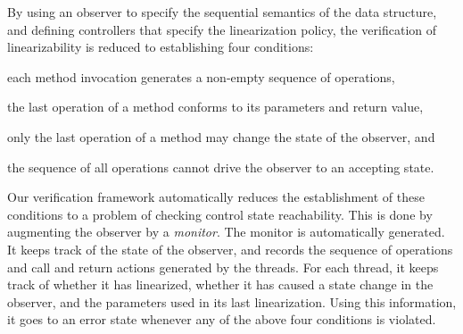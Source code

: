  By using an observer to specify the sequential semantics of the
data structure, and defining controllers that specify the linearization policy,
the verification of linearizability is reduced to establishing four conditions:
\begin{inparaenum}[(i)]
\item
  each method invocation generates a non-empty sequence of operations,
\item
  the last operation of a method conforms to its parameters and return value,
\item
  only the last operation of a method may
  change the state of the observer,
  and
\item
  the sequence of all operations
  cannot drive the observer to an accepting state.
\end{inparaenum}
Our verification framework automatically reduces
the establishment of these conditions to 
a problem of checking control state reachability. This is done by
augmenting the observer by a {\em monitor}. The monitor is automatically
generated. It keeps track of 
the state of the observer, and records the sequence of operations and
call and return actions generated by the threads.
For each thread, it keeps track of whether
it has linearized, whether it has caused a state change in the observer, and
the parameters used in its last linearization. Using this information, it
goes to an error state whenever any of the above four conditions is violated.




